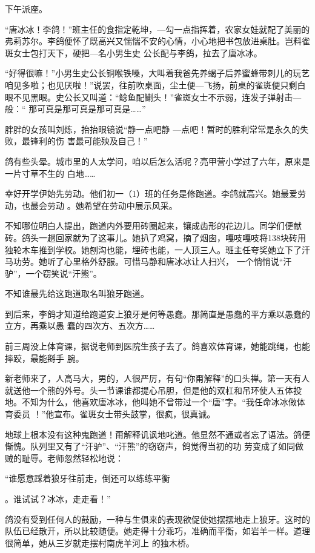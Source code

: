 \documentclass{article}
\begin{document}
下午派座。 

“唐冰冰！李鸽！”班主任的食指定乾坤，—勾一点指挥着，农家女娃就配了美丽的弗莉苏尔。李鸽便怀了既高兴又惴惴不安的心情，小心地把书包放进桌肚。岂料雀斑女士包打天下，硬把—名小男生史
公长配与李鸽，拉去了唐冰冰。 

“好得很嘛！”小男生史公长铜喉铁嗓，大叫着我爸先养蝎子后养蜜蜂带刺儿的玩艺咱见多啦；也见厌啦！”说罢，往前吹桌面，尘土便—飞扬，前桌的雀斑便只剩白眼不见黑眼。史公长又叫道：“鲶鱼配鯻头！”雀斑女士不示弱，连发子弹射击—般：“
那可真是那可真是那可真是……” 

胖胖的女孩叫刘炼，抬抬眼镜说“静一点吧静
\newpage
—点吧！暂时的胜利常常是永久的失败，最锋利的伤
害最可能殃及自己！” 

鸽有些头晕。城市里的人太学问，咱以后怎么活呢？亮甲营小学过了六年，原来是一片寸草不生的
白地…… 

幸好开学伊始先劳动。他们初一（1）班的任务是修跑道。李鸽就高兴。她最爱劳动，也最会劳动
。她希望在劳动中展示风采。 

不知哪位明白人提出，跑道内外要用砖圈起来，镶成齿形的花边儿。同学们便献砖。鸽头一趟回家就为了这事儿。她扒了鸡窝，摘了烟囱，嘎吱嘎吱将138块砖用独轮木车推到学校。她刨沟也能，埋砖也能，一人顶三人。班主任夸奖她立下了汗马功劳。她听了心里格外舒服。可惜马静和唐冰冰让人扫兴，
一个悄悄说“汗驴”，一个窃笑说“汗熊”。 


不知谁最先给这跑道取名叫狼牙跑道。 

\newpage

到后来，李鸽才知道给跑道安上狼牙是何等愚蠢。那简直是愚蠢的平方乘以愚蠢的立方，再乘以愚
蠢的四次方、五次方…… 

前三周没上体育课，据说老师到医院生孩子去了。鸽喜欢体育课，她能跳绳，也能摔跤，最能掰手
腕。 

新老师来了，人高马大，男的，人很严厉，有句“你甭解释”的口头禅。第一天有人就送他一个熊的外号。头一节课谁都提心吊胆，但是他的双杠和吊环使人五体投地。不知为什么，他喜欢唐冰冰，他叫她不曾带过一个“唐”字。“我任命冰冰做体育委员
！”他宣布。雀斑女士带头鼓掌，很疯，很真诚。 

地球上根本没有这种鬼跑道！甭解释讥讽地叱道。他显然不通或者忘了语法。鸽便惭愧。队列里又有了“汗驴”、“汗熊”的窃窃声，鸽觉得当初的功
劳变成了如同做贼的耻辱。老师忽然轻松地说： 

“谁愿意踩着狼牙往前走，倒还可以练练平衡
\newpage

。谁试试？冰冰，走走看！” 

鸽没有受到任何人的鼓励，一种与生俱来的表现欲促使她摆摆地走上狼牙。这时的队伍已经散开，所以比较随便。她走得十分乖巧，准确而平衡，如岩羊一样。道理很简单，她从三岁就走摆村南虎羊河上
的独木桥。 
\end{document}
